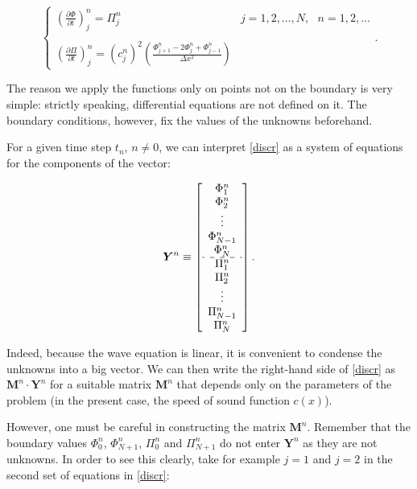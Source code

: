 \documentclass{article}
\begin{document}
\begin{equation}\label{discr}
\left\{\begin{array}{cc}
\displaystyle\left(\frac{\partial\Phi}{\partial t}\right)^n_j=\Pi^n_j&j=1,2,...,N,\text{ }n=1,2,...\\
\text{ }&\text{ }\\
\displaystyle\left(\frac{\partial \Pi}{\partial t}\right)^n_j=\left(c^n_j\right)^2\left(\frac{\Phi^n_{j+1}-2\Phi^n_j+\Phi^n_{j-1}}{\Delta x^2}\right)&\text{ }
\end{array}\right..
\end{equation}

The reason we apply the functions only on points not on the boundary is very simple: strictly speaking, differential equations are not defined on it. The boundary conditions, however, fix the values of the unknowns beforehand.

For a given time step $t_n$, $n\neq0$, we can interpret \eqref{discr} as a system of equations for the components of the vector:

\begin{equation}\label{Y}
\bm{Y}^n\equiv\left[\begin{array}{c}
\Phi^n_1\\
\Phi^n_2\\
\vdots\\
\Phi^n_{N-1}\\
\Phi^n_N\\
\hdashline
\Pi^n_1\\
\Pi^n_2\\
\vdots\\
\Pi^n_{N-1}\\
\Pi^n_N\\
\end{array}\right].
\end{equation}

Indeed, because the wave equation is linear, it is convenient to condense the unknowns into a big vector. We can then write the right-hand side of \eqref{discr} as $\bm{M}^n\cdot\bm{Y}^n$ for a suitable matrix $\bm{M}^n$ that depends only on the parameters of the problem (in the present case, the speed of sound function $c(x)$).

However, one must be careful in constructing the matrix $\bm{M}^n$. Remember that the boundary values $\Phi^n_0$, $\Phi^n_{N+1}$, $\Pi^n_0$ and $\Pi^n_{N+1}$ do not enter $\bm{Y}^n$ as they are not unknowns. In order to see this clearly, take for example $j=1$ and $j=2$ in the second set of equations in \eqref{discr}:
\end{document}
